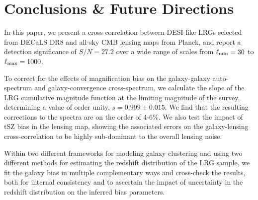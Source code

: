 \documentclass[a4paper,usenatbib]{mnras}
\begin{document}
\section{Conclusions \& Future Directions}\label{sec:conclusions}
%

In this paper, we present a cross-correlation between DESI-like LRGs selected from DECaLS DR8 and all-sky CMB lensing maps from Planck, and report a detection significance of $S/N = 27.2$ over a wide range of scales from $\ell_{\rm min} = 30$ to $\ell_{\rm max} = 1000$. 

To correct for the effects of magnification bias on the galaxy-galaxy auto-spectrum and galaxy-convergence cross-spectrum, we calculate the slope of the LRG cumulative magnitude function at the limiting magnitude of the survey, determining a value of order unity, $s = 0.999 \pm 0.015$. We find that the resulting corrections to the spectra are on the order of 4-6\%. We also test the impact of tSZ bias in the lensing map, showing the associated errors on the galaxy-lensing cross-correlation to be highly sub-dominant to the overall lensing noise.

Within two different frameworks for modeling galaxy clustering and using two different methods for estimating the redshift distribution of the LRG sample, we fit the galaxy bias in multiple complementary ways and cross-check the results, both for internal consistency and to ascertain the impact of uncertainty in the redshift distribution on the inferred bias parameters.
\end{document}
